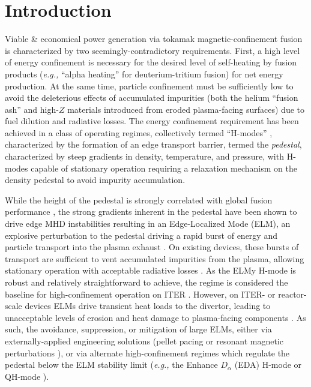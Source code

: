 \documentclass[12pt]{iopart}
\newcommand{\eg}{\emph{e.g., }}
\begin{document}
\section{Introduction}\label{sec:intro}

Viable \& economical power generation via tokamak magnetic-confinement fusion is characterized by two seemingly-contradictory requirements.
First, a high level of energy confinement is necessary for the desired level of self-heating by fusion products (\eg ``alpha heating'' for deuterium-tritium fusion) for net energy production.  
At the same time, particle confinement must be sufficiently low to avoid the deleterious effects of accumulated impurities (both the helium ``fusion ash'' and high-$Z$ materials introduced from eroded plasma-facing surfaces) due to fuel dilution and radiative losses.
The energy confinement requirement has been achieved in a class of operating regimes, collectively termed ``H-modes'' \cite{Wagner1982}, characterized by the formation of an edge transport barrier, termed the \emph{pedestal}, characterized by steep gradients in density, temperature, and pressure, with H-modes capable of stationary operation requiring a relaxation mechanism on the density pedestal to avoid impurity accumulation.

While the height of the pedestal is strongly correlated with global fusion performance \cite{Kinsey2011}, the strong gradients inherent in the pedestal have been shown to drive edge MHD instabilities \cite{Huysmans2005,Maget2013,Snyder2002} resulting in an Edge-Localized Mode (ELM), an explosive perturbation to the pedestal driving a rapid burst of energy and particle transport into the plasma exhaust \cite{Zohm1996}.  
On existing devices, these bursts of transport are sufficient to vent accumulated impurities from the plasma, allowing stationary operation with acceptable radiative losses \cite{Keilhacker1984}.
As the ELMy H-mode is robust and relatively straightforward to achieve, the regime is considered the baseline for high-confinement operation on ITER \cite{ITER1999,Shimada2007}.  
However, on ITER- or reactor-scale devices ELMs drive transient heat loads to the divertor, leading to unacceptable levels of erosion and heat damage to plasma-facing components \cite{Loarte2003,Federici2003}.
As such, the avoidance, suppression, or mitigation of large ELMs, either via externally-applied engineering solutions (pellet pacing \cite{Baylor2013,Lang2014} or resonant magnetic perturbations \cite{Evans2004,Evans2006}), or via alternate high-confinement regimes which regulate the pedestal below the ELM stability limit (\eg the Enhance $D_\alpha$ (EDA) H-mode \cite{Greenwald1999,Hubbard2001} or QH-mode \cite{Burrell2002,Suttrop2005}).
\end{document}
